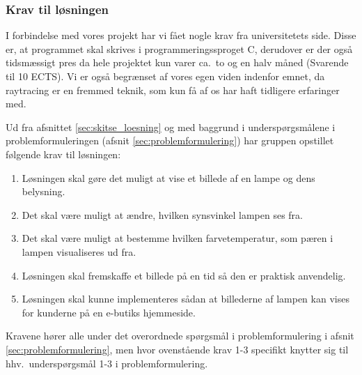 \subsubsection{Krav til løsningen}
\label{sec:krav}

I forbindelse med vores projekt har vi fået nogle krav fra universitetets side. Disse er, at programmet skal skrives i programmeringssproget C, derudover er der også tidsmæssigt pres da hele projektet kun varer ca.\ to og en halv måned (Svarende til 10 ECTS). 
Vi er også begrænset af vores egen viden indenfor emnet, da raytracing er en fremmed teknik, som kun få af os har haft tidligere erfaringer med. 

Ud fra afsnittet \ref{sec:skitse_loesning} og med baggrund i underspørgsmålene i problemformuleringen (afsnit \ref{sec:problemformulering}) har gruppen opstillet følgende krav til løsningen:
\begin{enumerate}
    \item Løsningen skal gøre det muligt at vise et billede af en lampe og dens belysning.
    \item Det skal være muligt at ændre, hvilken synsvinkel lampen ses fra.
    \item Det skal være muligt at bestemme hvilken farvetemperatur, som pæren i lampen visualiseres ud fra.
    \item Løsningen skal fremskaffe et billede på en tid så den er praktisk anvendelig.
    \item Løsningen skal kunne implementeres sådan at billederne af lampen kan vises for kunderne på en e-butiks hjemmeside.
\end{enumerate}

Kravene hører alle under det overordnede spørgsmål i problemformulering i afsnit \ref{sec:problemformulering}, men hvor ovenstående krav 1-3 specifikt knytter sig til hhv.\ underspørgsmål 1-3 i problemformulering.